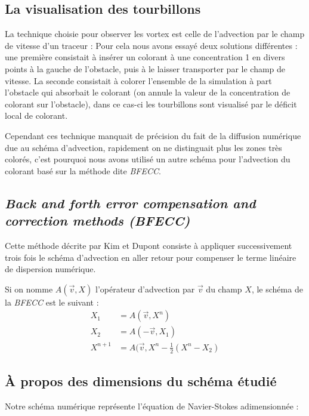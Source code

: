 	\subsection{La visualisation des tourbillons}
	
		La technique choisie pour observer les vortex est celle de l'advection par le champ de vitesse d'un traceur : Pour cela nous avons essayé deux solutions différentes : une première consistait à insérer un colorant à une concentration 1 en divers points à la gauche de l'obstacle, puis à le laisser transporter par le champ de vitesse. La seconde consistait à colorer l'ensemble de la simulation à part l'obstacle qui absorbait le colorant (on annule la valeur de la concentration de colorant sur l'obstacle), dans ce cas-ci les tourbillons sont visualisé par le déficit local de colorant.
		
		Cependant ces technique manquait de précision du fait de la diffusion numérique due au schéma d'advection, rapidement on ne distinguait plus les zones très colorés, c'est pourquoi nous avons utilisé un autre schéma pour l'advection du colorant basé sur la méthode dite \emph{BFECC}.
		
	\subsection{\emph{Back and forth error compensation and correction methods (BFECC)}}
		Cette méthode décrite par Kim \cite{Advect} et Dupont \cite{BFECC} consiste à appliquer successivement trois fois le schéma d'advection en aller retour pour compenser le terme linéaire de dispersion numérique.
		
		Si on nomme $A(\overrightarrow{v},X)$ l'opérateur d'advection par $\overrightarrow{v}$ du champ $X$, le schéma de la \emph{BFECC} est le suivant :
		\begin{align*}
  			X_1 &	= A(\overrightarrow{v},X^n) \\
			X_2	&	= A(-\overrightarrow{v},X_1)\\
			X^{n+1}&	= A(\overrightarrow{v},X^n-\frac{1}{2}(X^n-X_2)
		\end{align*}	

	\subsection{À propos des dimensions du schéma étudié}
	
		Notre schéma numérique représente l'équation de Navier-Stokes adimensionnée :

